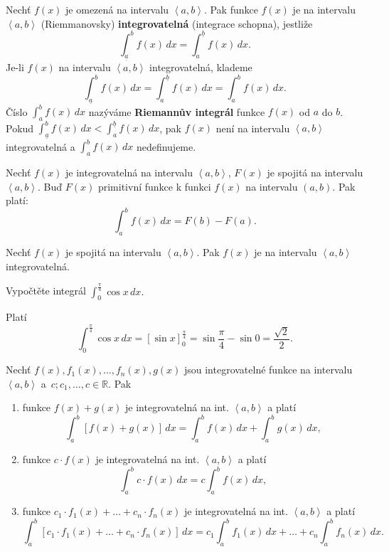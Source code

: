 \begin{definition}
Nechť $f(x)$ je omezená na intervalu $\left < a,b \right > .$ Pak funkce
$f(x)$ je na intervalu $\left < a,b \right > $ (Riemmanovsky) \textbf{integrovatelná}
(integrace schopna), jestliže
$$\int_{\underline{a}} ^b f(x)\, dx = \int_{a} ^{\underline{b}} f(x) \, dx.$$
Je-li $f(x)$ na intervalu $\left < a,b \right > $ integrovatelná, klademe
$$\int_{\underline{a}} ^b f(x)\, dx = \int_{a} ^{\underline{b}} f(x) \, dx = \int_{a} ^b f(x) \, dx.$$
Číslo $\int_{a} ^b f(x)\, dx$ nazýváme \textbf{Riemannův integrál} funkce $f(x)$ od
$a$ do $b$. Pokud $\int_{\underline{a}} ^b f(x)\, dx < \int_{a} ^{\underline{b}} f(x) \, dx$,
pak $f(x)$ není na intervalu $\left < a,b \right > $ integrovatelná a
$\int_{a} ^b f(x)\, dx$ nedefinujeme.
\end{definition}

\begin{veta}
Nechť $f(x)$ je integrovatelná na intervalu $\left < a,b \right >$, $F(x)$ je spojitá
na intervalu $\left < a,b \right > $. Buď $F(x)$ primitivní funkce k funkci $f(x)$
na intervalu $\left ( a,b \right ) $. Pak platí:
$$\int_{a} ^b f(x)\, dx=F(b)-F(a).$$
\end{veta}

\begin{veta}
Nechť $f(x)$ je spojitá na intervalu $\left < a,b \right > $. Pak $f(x)$ je na
intervalu $\left < a,b \right > $ integrovatelná.
\end{veta}

\begin{priklad}
Vypočtěte integrál $\int_0^{\frac{\pi}{4}}\cos x \, dx.$
\end{priklad}

\begin{reseni}
Platí
$$\int_0^{\frac{\pi}{4}}\cos x \, dx=\left [ \sin x  \right ]_0^{\frac{\pi}{4}}=\sin \frac{\pi}{4}-\sin 0=\frac{\sqrt{2} }{2}. $$
\end{reseni}

\begin{veta}
Nechť $f(x), f_1(x),\dots,f_n(x), g(x)$ jsou integrovatelné funkce na intervalu $\left < a,b \right > $
a~$c; c_1,\dots,c\in \mathbb R.$ Pak
\begin{enumerate}[$i.$]
\item funkce $f(x)+g(x)$ je integrovatelná na int. $\left < a,b \right > $ a platí
$$\int _a^b \left [ f(x)+g(x) \right ] \, dx = \int_a ^b f(x)\, dx + \int_a ^b g(x) \, dx,$$
\item funkce $c\cdot f(x)$ je integrovatelná na int. $\left < a,b \right > $ a platí
$$\int _a ^b c\cdot f(x) \, dx = c \int _a ^b f(x)\, dx,$$
\item funkce $c_1\cdot f_1(x) + \dots + c_n \cdot f_n(x)$ je integrovatelná na int. $\left < a,b \right > $ a platí
$$\int_a ^b \left [ c_1\cdot f_1(x) + \dots + c_n \cdot f_n (x) \right ]\, dx = c_1 \int _a ^b f_1(x)\, dx + \dots + c_n \int _a ^b f_n(x)\, dx. $$
\end{enumerate}
\end{veta}

